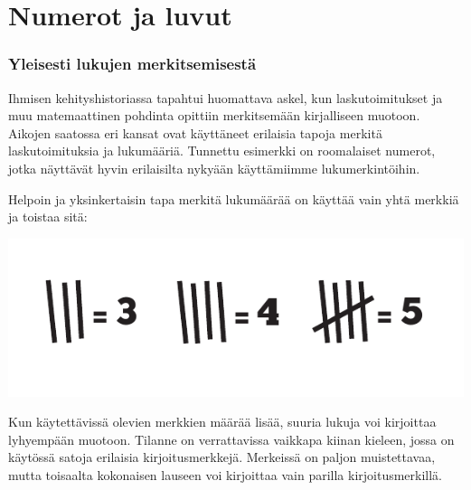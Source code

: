 \section*{Numerot ja luvut}


\subsubsection*{Yleisesti lukujen merkitsemisestä}

Ihmisen kehityshistoriassa tapahtui huomattava askel, kun laskutoimitukset ja muu matemaattinen pohdinta opittiin merkitsemään kirjalliseen muotoon. Aikojen saatossa eri kansat ovat käyttäneet erilaisia tapoja merkitä laskutoimituksia ja lukumääriä. Tunnettu esimerkki on roomalaiset numerot, jotka näyttävät hyvin erilaisilta nykyään käyttämiimme lukumerkintöihin.

Helpoin ja yksinkertaisin tapa merkitä lukumäärää on käyttää vain yhtä merkkiä ja toistaa sitä:


\begin{center}
\includegraphics{pictures/Kuva1-1-tukkimiehenkirjanpito.pdf}
\end{center}

Kun käytettävissä olevien merkkien määrää lisää, suuria lukuja voi kirjoittaa lyhyempään muotoon. Tilanne on verrattavissa vaikkapa kiinan kieleen, jossa on käytössä satoja erilaisia kirjoitusmerkkejä. Merkeissä on paljon muistettavaa, mutta toisaalta kokonaisen lauseen voi kirjoittaa vain parilla kirjoitusmerkillä.



